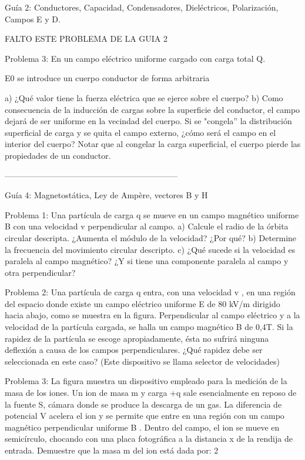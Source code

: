 
Guía 2: Conductores, Capacidad, Condensadores, Dieléctricos, Polarización, Campos E y D.

FALTO ESTE PROBLEMA DE LA GUIA 2

 
Problema 3:
En un campo eléctrico uniforme cargado con carga total Q.

E0    se introduce un cuerpo conductor de forma arbitraria
 
a)	¿Qué valor tiene la fuerza eléctrica que se ejerce sobre el cuerpo?
b)	Como consecuencia de la inducción de cargas sobre la superficie del conductor, el campo dejará de ser uniforme en la vecindad del cuerpo. Si se "congela'' la distribución superficial de carga y se quita el campo externo, ¿cómo será el campo en el interior del cuerpo? Notar que al congelar la carga superficial, el cuerpo pierde las propiedades de un conductor.


---------------------------------------------------------------




Guía 4: Magnetostática, Ley de Ampère, vectores B y H

Problema 1:
Una partícula de carga q se mueve en un campo magnético uniforme B con una velocidad v
perpendicular al campo.
a)	Calcule el radio de la órbita circular descripta. ¿Aumenta el módulo de la velocidad? ¿Por qué?
b)	Determine la frecuencia del movimiento circular descripto.
c)	¿Qué sucede si la velocidad es paralela al campo magnético? ¿Y si tiene una componente paralela al campo y otra perpendicular?

Problema 2:
Una partícula de carga q entra, con una velocidad v , en una región del espacio donde existe un campo eléctrico uniforme E de 80 kV/m dirigido hacia abajo, como se muestra en la figura. Perpendicular al campo eléctrico y a la velocidad de la partícula cargada, se halla un campo
magnético B de 0,4T. Si la rapidez de la partícula se escoge apropiadamente, ésta no sufrirá ninguna deflexión a causa de los campos perpendiculares. ¿Qué rapidez debe ser seleccionada en este caso? (Este dispositivo se llama selector de velocidades)

Problema 3:
La figura muestra un dispositivo empleado para la medición de la masa de los iones. Un ion de masa m y carga +q sale esencialmente en reposo de la fuente S, cámara donde se produce la descarga de un gas. La diferencia de potencial V acelera el ion y se permite que entre  en  una  región  con  un  campo  magnético  perpendicular
uniforme B . Dentro del campo, el ion se mueve en semicírculo, chocando con una placa fotográfica a la distancia x de la rendija de entrada. Demuestre que la masa m del ion está dada por:
2
 
